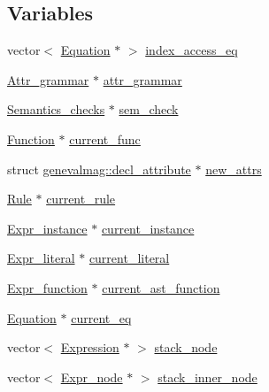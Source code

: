 \subsection*{Variables}
\begin{DoxyCompactItemize}
\item 
vector$<$ \hyperlink{classgenevalmag_1_1Equation}{Equation} $\ast$ $>$ \hyperlink{namespacegenevalmag_a4bc1208b99175d15ec86291f80f5428f}{index\_\-access\_\-eq}
\item 
\hyperlink{classgenevalmag_1_1Attr__grammar}{Attr\_\-grammar} $\ast$ \hyperlink{namespacegenevalmag_a85aabf29d2f206619e2d128154283336}{attr\_\-grammar}
\item 
\hyperlink{classgenevalmag_1_1Semantics__checks}{Semantics\_\-checks} $\ast$ \hyperlink{namespacegenevalmag_ad93efa78140ac10eefb71fdb44c48b6b}{sem\_\-check}
\item 
\hyperlink{classgenevalmag_1_1Function}{Function} $\ast$ \hyperlink{namespacegenevalmag_a910b57b31dc9d8772d89a082d88f0c50}{current\_\-func}
\item 
struct \hyperlink{structgenevalmag_1_1decl__attribute}{genevalmag::decl\_\-attribute} $\ast$ \hyperlink{namespacegenevalmag_a3564619b24ff1e9243dee9e501181679}{new\_\-attrs}
\item 
\hyperlink{classgenevalmag_1_1Rule}{Rule} $\ast$ \hyperlink{namespacegenevalmag_afc4896526f13792a5f56fa1c254759d4}{current\_\-rule}
\item 
\hyperlink{classgenevalmag_1_1Expr__instance}{Expr\_\-instance} $\ast$ \hyperlink{namespacegenevalmag_a4e01071642cc57ba91fe84d929195c7c}{current\_\-instance}
\item 
\hyperlink{classgenevalmag_1_1Expr__literal}{Expr\_\-literal} $\ast$ \hyperlink{namespacegenevalmag_a09a13d15a03643602e801cf36685ede0}{current\_\-literal}
\item 
\hyperlink{classgenevalmag_1_1Expr__function}{Expr\_\-function} $\ast$ \hyperlink{namespacegenevalmag_a5d3b27c53cfad3c612dc56f1750c44a2}{current\_\-ast\_\-function}
\item 
\hyperlink{classgenevalmag_1_1Equation}{Equation} $\ast$ \hyperlink{namespacegenevalmag_ad81ea3b166738b52ec4a3b7ac291e64b}{current\_\-eq}
\item 
vector$<$ \hyperlink{classgenevalmag_1_1Expression}{Expression} $\ast$ $>$ \hyperlink{namespacegenevalmag_a47998af84055c40ecfcdfe156f71be04}{stack\_\-node}
\item 
vector$<$ \hyperlink{classgenevalmag_1_1Expr__node}{Expr\_\-node} $\ast$ $>$ \hyperlink{namespacegenevalmag_a0b445db6f5f211e8d78b693596cbda3c}{stack\_\-inner\_\-node}
\end{DoxyCompactItemize}



